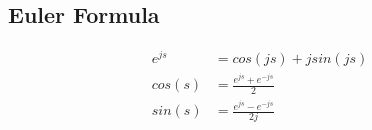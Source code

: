 \subsection{Euler Formula}
    \begin{align*}
        e^{js} &= cos(js) + j sin(js)\\
        cos(s) &= \frac{e^{js} + e^{-js}}{2}\\
        sin(s) &= \frac{e^{js} - e^{-js}}{2j}
    \end{align*}